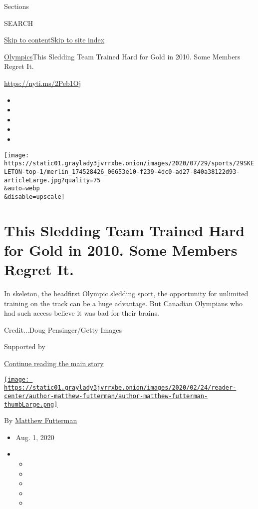 Sections

SEARCH

\protect\hyperlink{site-content}{Skip to
content}\protect\hyperlink{site-index}{Skip to site index}

\href{/section/sports/olympics}{Olympics}\textbar{}This Sledding Team
Trained Hard for Gold in 2010. Some Members Regret It.

\url{https://nyti.ms/2Peb1Oj}

\begin{itemize}
\item
\item
\item
\item
\item
\end{itemize}

\texttt{[image: https://static01.graylady3jvrrxbe.onion/images/2020/07/29/sports/29SKELETON-top-1/merlin\_174528426\_06653e10-f239-4dc0-ad27-840a38122d93-articleLarge.jpg?quality=75\\\&auto=webp\\\&disable=upscale]}

\hypertarget{this-sledding-team-trained-hard-for-gold-in-2010-some-members-regret-it}{%
\section{This Sledding Team Trained Hard for Gold in 2010. Some Members
Regret
It.}\label{this-sledding-team-trained-hard-for-gold-in-2010-some-members-regret-it}}

In skeleton, the headfirst Olympic sledding sport, the opportunity for
unlimited training on the track can be a huge advantage. But Canadian
Olympians who had such access believe it was bad for their brains.

Credit...Doug Pensinger/Getty Images

Supported by

\protect\hyperlink{after-sponsor}{Continue reading the main story}

\href{https://www.nytimes3xbfgragh.onion/by/matthew-futterman}{\texttt{[image: https://static01.graylady3jvrrxbe.onion/images/2020/02/24/reader-center/author-matthew-futterman/author-matthew-futterman-thumbLarge.png]}}

By
\href{https://www.nytimes3xbfgragh.onion/by/matthew-futterman}{Matthew
Futterman}

\begin{itemize}
\item
  Aug. 1, 2020
\item
  \begin{itemize}
  \item
  \item
  \item
  \item
  \item
  \end{itemize}
\end{itemize}

